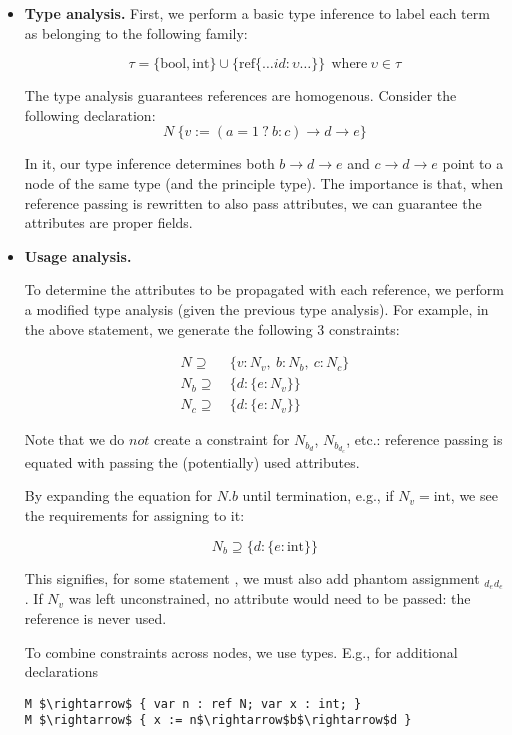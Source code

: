 \begin{itemize}
\item \textbf{Type analysis.}
First, we perform a basic type inference to label each term as belonging to the following family:

$$\tau = \{ \text{bool}, \text{int} \} \cup \{ \text{ref} \{ \ldots id : \upsilon \ldots \} \} ~~ \text{where} ~\upsilon \in \tau $$

The type analysis guarantees references are homogenous. Consider the following declaration: 
$$N ~ \{ v := (a = 1 ~?~ b : c)\rightarrow d \rightarrow e \} $$

In it, our type inference determines both $b \rightarrow d \rightarrow e$ and $c \rightarrow d \rightarrow e$ point to a node of the same type (and the principle type). The importance is that, when reference passing is rewritten to also pass attributes, we can guarantee the attributes are proper fields.

\item \textbf{Usage analysis.}

To determine the attributes to be propagated with each reference, we perform a modified type analysis (given the previous type analysis). For example, in the above statement, we generate the following 3 constraints:

\begin{align*}
N \supseteq & ~ \{ v: N_v, ~b: N_b, ~c: N_c \} \\
N_b \supseteq & ~ \{d: \{e: N_v \} \} \\
N_c \supseteq & ~ \{d: \{e: N_v \} \}
\end{align*}

Note that we do $not$ create a constraint for $N_{b_d}$, $N_{b_{d_e}}$, etc.: reference passing is equated with passing the (potentially) used attributes.

By expanding the equation for $N.b$ until termination, e.g., if $N_v = \text{int}$, we see the requirements for assigning to it:

$$N_b \supseteq \{d: \{e: \text{int} \}\}$$

This signifies, for some statement , we must also add phantom assignment ${_{d_e}}$${_{d_e}}$\code{\}}. If $N_v$ was left unconstrained, no attribute would need to be passed: the reference is never used. 

To combine constraints across nodes, we use types. E.g., for additional declarations 

\begin{lstlisting}[mathescape]
M $\rightarrow$ { var n : ref N; var x : int; }
M $\rightarrow$ { x := n$\rightarrow$b$\rightarrow$d }
\end{lstlisting}


\end{itemize}
